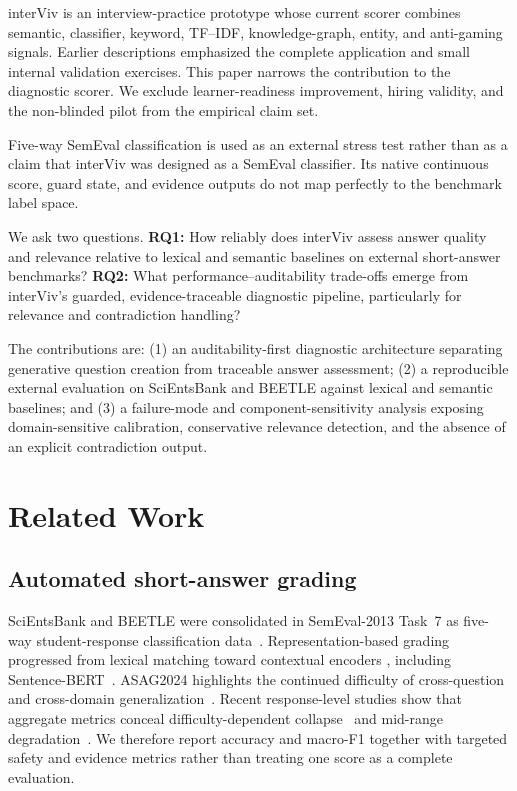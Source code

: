 \documentclass[conference,a4paper]{IEEEtran}
\begin{document}
interViv is an interview-practice prototype whose current scorer combines
semantic, classifier, keyword, TF--IDF, knowledge-graph, entity, and
anti-gaming signals. Earlier descriptions emphasized the complete application
and small internal validation exercises. This paper narrows the contribution
to the diagnostic scorer. We exclude learner-readiness improvement, hiring
validity, and the non-blinded pilot from the empirical claim set.

Five-way SemEval classification is used as an external stress test rather than
as a claim that interViv was designed as a SemEval classifier. Its native
continuous score, guard state, and evidence outputs do not map perfectly to the
benchmark label space.

We ask two questions. \textbf{RQ1:} How reliably does interViv assess answer
quality and relevance relative to lexical and semantic baselines on external
short-answer benchmarks? \textbf{RQ2:} What performance--auditability
trade-offs emerge from interViv's guarded, evidence-traceable diagnostic
pipeline, particularly for relevance and contradiction handling?

The contributions are: (1) an auditability-first diagnostic architecture
separating generative question creation from traceable answer assessment; (2)
a reproducible external evaluation on SciEntsBank and BEETLE against lexical
and semantic baselines; and (3) a failure-mode and component-sensitivity
analysis exposing domain-sensitive calibration, conservative relevance
detection, and the absence of an explicit contradiction output.

\section{Related Work}

\subsection{Automated short-answer grading}

SciEntsBank and BEETLE were consolidated in SemEval-2013 Task~7 as five-way
student-response classification data~\cite{dzikovska2013}. Representation-based
grading progressed from lexical matching toward contextual encoders
\cite{haller2022}, including Sentence-BERT~\cite{reimers2019}. ASAG2024
highlights the continued difficulty of cross-question and cross-domain
generalization~\cite{meyer2024}. Recent response-level studies show that
aggregate metrics conceal difficulty-dependent collapse~\cite{cong2026} and
mid-range degradation~\cite{schleifer2026}. We therefore report accuracy and
macro-F1 together with targeted safety and evidence metrics rather than
treating one score as a complete evaluation.
\end{document}
